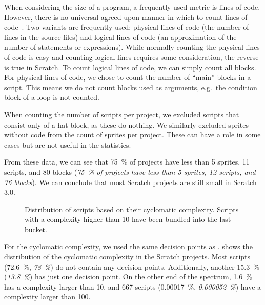 \documentclass[../main]{subfiles}
\begin{document}
When considering the size of a program, a frequently used metric is lines of code.
However, there is no universal agreed-upon manner in which to count lines of code~\autocite{nguyenSLOCCountingStandard2007}.
Two variants are frequently used: physical lines of code (the number of lines in the source files) and logical lines of code (an approximation of the number of statements or expressions).
While normally counting the physical lines of code is easy and counting logical lines requires some consideration, the reverse is true in Scratch.
To count logical lines of code, we can simply count all blocks.
For physical lines of code, we chose to count the number of ``main'' blocks in a script.
This means we do not count blocks used as arguments, e.g.\ the condition block of a loop is not counted.

When counting the number of scripts per project, we excluded scripts that consist only of a hat block, as these do nothing.
We similarly excluded sprites without code from the count of sprites per project.
These can have a role in some cases but are not useful in the statistics.

From these data, we can see that \qty{75}{\percent} of projects have less than 5 sprites, 11 scripts, and 80 blocks (\textit{\qty{75}{\percent} of projects have less than 5 sprites, 12 scripts, and 76 blocks}).
We can conclude that most Scratch projects are still small in Scratch 3.0.

\begin{figure}
    \begin{wide}
        
    \end{wide}
    \caption{
        Distribution of scripts based on their cyclomatic complexity.
        Scripts with a complexity higher than 10 have been bundled into the last bucket.
    }
    \label{fig:scratch-cc}
\end{figure}

For the cyclomatic complexity, we used the same decision points as \citeauthor{aivaloglouHowKidsCode2016}.
 shows the distribution of the cyclomatic complexity in the Scratch projects.
Most scripts (\qty{72.6}{\percent}, \textit{\qty{78}{\percent}}) do not contain any decision points.
Additionally, another \qty{15.3}{\percent} (\textit{\qty{13.8}{\percent}}) has just one decision point.
On the other end of the spectrum, \qty{1.6}{\percent} has a complexity larger than 10, and 667 scripts (\qty{0.00017}{\percent}, \textit{\qty{0.000052}{\percent}}) have a complexity larger than 100.
\end{document}
